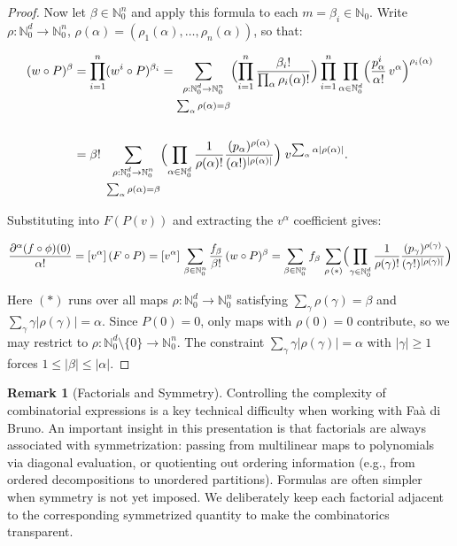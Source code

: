 \documentclass[10pt,a4paper]{article}
\theoremstyle{plain}
\theoremstyle{definition}
\newtheorem{remark}[theorem]{Remark}
\newcommand{\IN}{\mathbb{N}} %
\newcommand{\del}{\partial} %
\newcommand{\1}{\mathbb{1}} %
\newcommand{\set}[1]{\{#1\}} %
\newcommand{\ra}{\rightarrow} %
\newcommand{\ssum}[1]{\sum_{\substack{#1}}} %
\begin{document}
\begin{proof}
Now let \(\beta \in \IN_0^n\) and apply this formula to each
\(m = \beta_i \in \IN_0\). Write \(\rho: \IN_0^d \ra \IN_0^n\),
\(\rho(\alpha) = (\rho_1(\alpha),\dots,\rho_n(\alpha))\), so that:

\begin{align*}
  (w \circ P)^\beta
&=
  \prod_{i=1}^n (w^i \circ P)^{\beta_i}
=
  \ssum{\rho:\IN_0^d \ra \IN_0^n\\\\ \sum_\alpha \rho(\alpha) = \beta}
  \Bigl(
    \prod_{i=1}^n
    \frac{\beta_i!}{\prod_\alpha \rho_i(\alpha)!}
  \Bigr)
  \prod_{i=1}^n
  \prod_{\alpha \in \IN_0^d}
  \Bigl(
    \frac{p_\alpha^i}{\alpha!}\,v^\alpha
  \Bigr)^{\rho_i(\alpha)}
  \\\\
&=
  \beta! \;
  \ssum{\rho:\IN_0^d \ra \IN_0^n \\\\ \sum_\alpha \rho(\alpha) = \beta}
  \Bigl(
    \prod_{\alpha \in \IN_0^d}
    \frac{1}{\rho(\alpha)!}
    \frac{(p_\alpha)^{\rho(\alpha)}}{(\alpha!)^{|\rho(\alpha)|}}
  \Bigr) \;
  v^{\sum_\alpha \alpha|\rho(\alpha)|}.
\end{align*}

Substituting into \(F(P(v))\) and extracting the \(v^\alpha\)
coefficient gives:

\begin{align*}
  \frac{\del^\alpha (f \circ \phi) (0)}{\alpha!}
= 
  [v^\alpha]\, (F \circ P)
=
  [v^\alpha]\,
  \sum_{\beta\in\IN_0^n}
  \frac{f_\beta}{\beta!}\,(w \circ P)^\beta
=
  \sum_{\beta\in\IN_0^n}
  f_\beta\,
  \sum_{\rho\,(*)}
  \Bigl(
    \prod_{\gamma \in \IN_0^d}
    \frac{1}{\rho(\gamma)!}
    \frac{(p_\gamma)^{\rho(\gamma)}}{(\gamma!)^{|\rho(\gamma)|}}
  \Bigr)
\end{align*}

Here \((\ast)\) runs over all maps \(\rho:\IN_0^d \ra \IN_0^n\)
satisfying \(\sum_\gamma \rho(\gamma) = \beta\) and
\(\sum_\gamma \gamma|\rho(\gamma)| = \alpha\). Since \(P(0) = 0\), only
maps with \(\rho(0) = 0\) contribute, so we may restrict to
\(\rho:\IN_0^d\setminus\set{0} \ra \IN_0^n\). The constraint
\(\sum_\gamma \gamma|\rho(\gamma)| = \alpha\) with \(|\gamma| \geq 1\)
forces \(1 \leq |\beta| \leq |\alpha|\).

\end{proof}

\begin{remark}[Factorials and Symmetry]

Controlling the complexity of combinatorial expressions is a key
technical difficulty when working with Faà di Bruno. An important
insight in this presentation is that factorials are always associated
with symmetrization: passing from multilinear maps to polynomials via
diagonal evaluation, or quotienting out ordering information (e.g., from
ordered decompositions to unordered partitions). Formulas are often
simpler when symmetry is not yet imposed. We deliberately keep each
factorial adjacent to the corresponding symmetrized quantity to make the
combinatorics transparent.

\end{remark}
\end{document}
